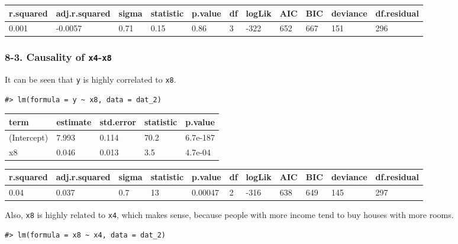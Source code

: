 \documentclass[main.tex]{subfiles}
\begin{document}
\begin{table}[H]
\centering
\begin{tabular}{lllllllllll}
\toprule
r.squared & adj.r.squared & sigma & statistic & p.value & df & logLik & AIC & BIC & deviance & df.residual\\
\midrule
0.001 & -0.0057 & 0.71 & 0.15 & 0.86 & 3 & -322 & 652 & 667 & 151 & 296\\
\bottomrule
\end{tabular}
\end{table}

\hypertarget{causality-of-x4-x8}{%
\subsubsection{\texorpdfstring{8-3. Causality of
\texttt{x4}-\texttt{x8}}{8-3. Causality of x4-x8}}\label{causality-of-x4-x8}}

It can be seen that \texttt{y} is highly correlated to \texttt{x8}.

\begin{verbatim}
#> lm(formula = y ~ x8, data = dat_2)
\end{verbatim}

\begin{table}[H]
\centering
\begin{tabular}{lllll}
\toprule
term & estimate & std.error & statistic & p.value\\
\midrule
(Intercept) & 7.993 & 0.114 & 70.2 & 6.7e-187\\
x8 & 0.046 & 0.013 & 3.5 & 4.7e-04\\
\bottomrule
\end{tabular}
\end{table}

\begin{table}[H]
\centering
\begin{tabular}{lllllllllll}
\toprule
r.squared & adj.r.squared & sigma & statistic & p.value & df & logLik & AIC & BIC & deviance & df.residual\\
\midrule
0.04 & 0.037 & 0.7 & 13 & 0.00047 & 2 & -316 & 638 & 649 & 145 & 297\\
\bottomrule
\end{tabular}
\end{table}

Also, \texttt{x8} is highly related to \texttt{x4}, which makes sense,
because people with more income tend to buy houses with more rooms.

\begin{verbatim}
#> lm(formula = x8 ~ x4, data = dat_2)
\end{verbatim}
\end{document}
